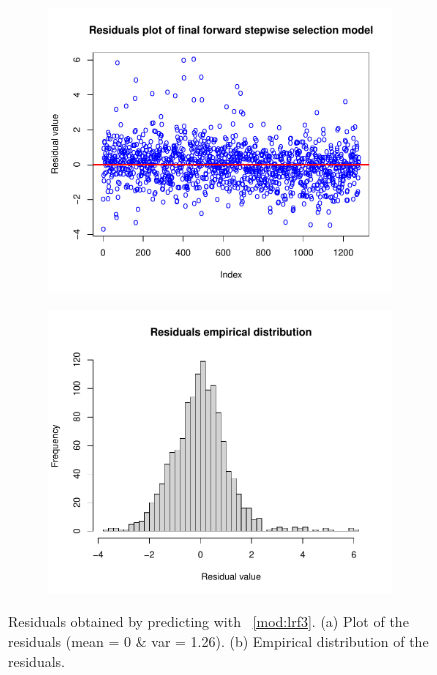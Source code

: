 \begin{figure}[H]
	\centering
	\begin{subfigure}{.5\textwidth}
		\centering
		\includegraphics[width=0.7\linewidth]{ImageFiles/Regression/Forward/ForwardFinalModelResiduals.pdf}
		\caption{}
		\label{fig:ForwardFinalModelResiduals}
	\end{subfigure}%
	\begin{subfigure}{.5\textwidth}
		\centering
		\includegraphics[width=0.7\linewidth]{ImageFiles/Regression/Forward/ForwardFinalModelResidualsDist.pdf}
		\caption{}
		\label{fig:ForwardFinalModelResidualsDist}
	\end{subfigure}
	\caption{Residuals obtained by predicting with \Mod~\ref{mod:lrf3}. (a) Plot of the residuals (mean = 0 \& var = 1.26). (b) Empirical distribution of the residuals.}
	\label{fig:FinalFSSM}
\end{figure}

